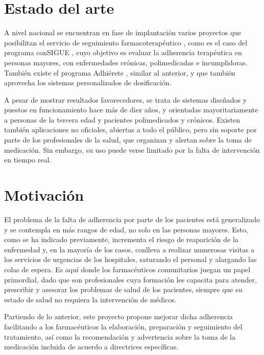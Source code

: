 \section{Estado del arte}
A nivel nacional se encuentran en fase de implantación varios proyectos que posibilitan el servicio de seguimiento farmacoterapéutico \cite{CONTHE2014336}, como es el caso del programa conSIGUE \cite{programa_consigue}, cuyo objetivo es evaluar la adherencia terapéutica en personas mayores, con enfermedades crónicas, polimedicadas e incumplidoras. También existe el programa Adhiérete \cite{programa_adhierete_2015}, similar al anterior, y que también aprovecha los sistemas personalizados de dosificación. 

A pesar de mostrar resultados favorecedores, se trata de sistemas diseñados y puestos en funcionamiento hace más de diez años, y orientadas mayoritariamente a personas de la tercera edad y pacientes polimedicados y crónicos. Existen también aplicaciones no oficiales, abiertas a todo el público, pero sin soporte por parte de los profesionales de la salud, que organizan y alertan sobre la toma de medicación. Sin embargo, su uso puede verse limitado por la falta de intervención en tiempo real. 

\section{Motivación}

El problema de la falta de adherencia por parte de los pacientes está generalizado y se contempla en más rangos de edad, no solo en las personas mayores. Esto, como se ha indicado previamente, incrementa el riesgo de reaparición de la enfermedad y, en la mayoría de los casos, conlleva a realizar numerosas visitas a los servicios de urgencias de los hospitales, saturando el personal y alargando las colas de espera. Es aquí donde los farmacéuticos comunitarios juegan un papel primordial, dado que son profesionales cuya formación les capacita para atender, prescribir y asesorar los problemas de salud de los pacientes, siempre que su estado de salud no requiera la intervención de médicos.

Partiendo de lo anterior, este proyecto propone mejorar dicha adherencia facilitando a los farmacéuticos la elaboración, preparación y seguimiento del tratamiento, así como la recomendación y advertencia sobre la toma de la medicación incluida de acuerdo a directrices específicas. 

